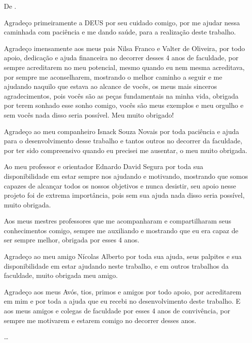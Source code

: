 \begin{agradecimentos}
\vspace*{\fill}
De \imprimirAutorDois.
\newline
\par Agradeço primeiramente a DEUS por seu cuidado comigo, por me ajudar nessa caminhada com paciência e me dando saúde, para a realização deste trabalho.
\par Agradeço imensamente aos meus pais Nilsa Franco e Valter de Oliveira, por todo apoio, dedicação e ajuda financeira no decorrer desses 4 anos de faculdade, por sempre acreditarem no meu potencial, mesmo quando eu nem mesma acreditava, por sempre me aconselharem, mostrando o melhor caminho a seguir e me ajudando naquilo que estava ao alcance de vocês, os meus mais sinceros agradecimentos, pois vocês são as peças fundamentais na minha vida, obrigada por terem sonhado esse sonho comigo, vocês são meus exemplos e meu orgulho e  sem vocês nada disso seria possível. Meu muito obrigado!
\par Agradeço ao meu companheiro Isnack Souza Novais por toda paciência e ajuda para o desenvolvimento desse trabalho e tantos outros no decorrer da faculdade, por ter sido compreensivo quando eu precisei me ausentar, o meu muito obrigada.
\par Ao meu professor e orientador Ednardo David Segura por toda sua disponibilidade em estar sempre nos ajudando e motivando, mostrando que somos capazes de alcançar todos os nossos objetivos e nunca desistir, seu apoio nesse projeto foi de extrema importância, pois sem sua ajuda nada disso seria possível, muito obrigada.
\par Aos meus mestres professores que me acompanharam e compartilharam seus conhecimentos comigo, sempre me auxiliando e mostrando que eu era capaz de ser sempre melhor, obrigada por esses 4 anos. 
\par Agradeço ao meu amigo Nícolas Alberto por toda sua ajuda, seus palpites e sua disponibilidade em estar ajudando neste trabalho, e em outros trabalhos da faculdade, muito obrigada meu amigo.
\par Agradeço aos meus Avós, tios, primos e amigos por todo apoio, por acreditarem em mim e por toda a ajuda que eu recebi no desenvolvimento deste trabalho. E aos meus amigos e colegas de faculdade por esses 4 anos de convivência, por sempre me motivarem e estarem comigo no decorrer desses anos.

\ldots

\end{agradecimentos}




